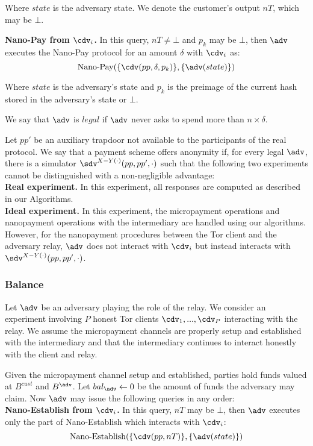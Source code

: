 Where $state$ is the adversary state.
We denote the customer's output $nT$, which may be $\bot$.

\textbf{Nano-Pay from $\cdv_i$.}
In this query, $nT \neq \bot$ and $p_k$ may be $\bot$, then $\adv$ executes the Nano-Pay protocol for an amount $\delta$ with $\cdv_i$ as: $$\operatorname{Nano-Pay}(\{\cdv(pp, \delta, p_k)\}, \{\adv(state)\})$$

Where $state$ is the adversary's state and $p_k$ is the preimage of the current hash stored in the adversary's state or $\bot$.

We say that $\adv$ is $legal$ if $\adv$ never asks to spend more than $n \times \delta$.

Let $pp'$ be an auxiliary trapdoor not available to the participants of the real protocol.
We say that a payment scheme offers anonymity if, for every legal $\adv$, there is a simulator $\sdv^{X-Y(\cdot)}(pp, pp', \cdot)$ such that the following two experiments cannot be distinguished with a non-negligible advantage:\\ \textbf{Real experiment.}
In this experiment, all responses are computed as described in our Algorithms.\\ \textbf{Ideal experiment.}
In this experiment, the micropayment operations and nanopayment operations with the intermediary are handled using our algorithms.
However, for the nanopayment procedures between the Tor client and the adversary relay, $\adv$ does not interact with $\cdv_i$ but instead interacts with $\sdv^{X-Y(\cdot)}(pp,pp',\cdot)$.

\subsubsection{Balance}
\label{def:balance}

Let $\adv$ be an adversary playing the role of the relay.
We consider an experiment involving $P$ honest Tor clients $\cdv_1,..., \cdv_P$ interacting with the relay.
We assume the micropayment channels are properly setup and established with the intermediary and that the intermediary continues to interact honestly with the client and relay.

Given the micropayment channel setup and established, parties hold funds valued at $B^{cust}$ and $B^{\adv}$.
Let $bal_\adv \leftarrow 0$ be the amount of funds the adversary may claim.
Now $\adv$ may issue the following queries in any order:\\

\textbf{Nano-Establish from $\cdv_i$.}
In this query, $nT$ may be $\bot$, then $\adv$ executes only the part of Nano-Establish which interacts with $\cdv_i$: $$\operatorname{Nano-Establish}(\{\cdv(pp, nT)\}, \{\adv(state)\})$$

